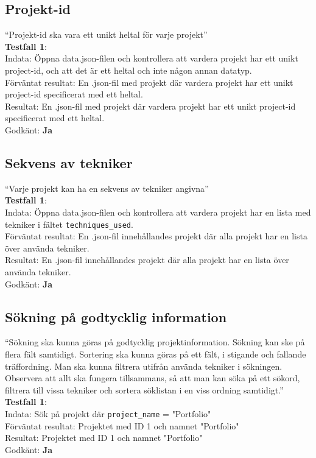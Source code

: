 \documentclass{TDP003mall}
\begin{document}
\subsection{Projekt-id}
“Projekt-id ska vara ett unikt heltal för varje projekt”\\
\textbf{Testfall 1}:\\
Indata: Öppna data.json-filen och kontrollera att vardera projekt har ett unikt project-id, och att det är ett heltal och inte någon annan datatyp.\\
Förväntat resultat: En .json-fil med projekt där vardera projekt har ett unikt project-id specificerat med ett heltal.\\
Resultat: En .json-fil med projekt där vardera projekt har ett unikt project-id specificerat med ett heltal.\\
Godkänt: \textbf{Ja}


\subsection{Sekvens av tekniker}
“Varje projekt kan ha en sekvens av tekniker angivna”\\
\textbf{Testfall 1}:\\
Indata: Öppna data.json-filen och kontrollera att vardera projekt har en lista med tekniker i fältet \verb|techniques_used|.\\
Förväntat resultat: En .json-fil innehållandes projekt där alla projekt har en lista över använda tekniker.\\
Resultat: En .json-fil innehållandes projekt där alla projekt har en lista över använda tekniker.\\
Godkänt: \textbf{Ja}


\subsection{Sökning på godtycklig information}
“Sökning ska kunna göras på godtycklig projektinformation. Sökning kan ske på flera fält samtidigt. Sortering ska kunna göras på ett fält, i stigande och fallande träffordning. Man ska kunna filtrera utifrån använda tekniker i sökningen. Observera att allt ska fungera tillsammans, så att man kan söka på ett sökord, filtrera till vissa tekniker och sortera söklistan i en viss ordning samtidigt.”\\
\textbf{Testfall 1}:\\
Indata: Sök på projekt där \verb|project_name| = "Portfolio"\\
Förväntat resultat: Projektet med ID 1 och namnet "Portfolio"\\
Resultat: Projektet med ID 1 och namnet "Portfolio"\\
Godkänt: \textbf{Ja}
\end{document}
